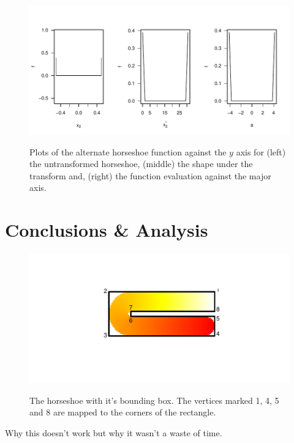 \begin{figure}
\centering
\includegraphics[trim=0in 0in 0in 0in]{figs/altcentrelinelineplots.pdf} \\
\caption{Plots of the alternate horseshoe function against the $y$ axis for (left) the untransformed horseshoe, (middle) the shape under the \sch transform and, (right) the function evaluation against the major axis.}
\label{altcentrelinelineplot}
\end{figure}



















\section{Conclusions \& Analysis}


\begin{figure}
\centering
\includegraphics[trim=0.5in 1in 0in 1in]{sc/figs/hswithboundingbox.pdf} \\
\caption{The horseshoe with it's bounding box. The vertices marked 1, 4, 5 and 8 are mapped to the corners of the rectangle.}
\label{hswithboundingbox}
\end{figure}






Why this doesn't work but why it wasn't a waste of time.
